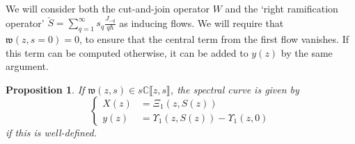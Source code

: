 \documentclass[10pt,a4paper,oneside,no-math,reqno]{amsart}%
\theoremstyle{plain}
\newtheorem{proposition}[theorem]{Proposition}
\theoremstyle{definition}
\theoremstyle{remark}
\numberwithin{equation}{section}
\newcommand{\mb}[1]{\mathbb{#1}}
\newcommand{\mf}[1]{\mathfrak{#1}}
\newcommand{\1}{\mathds{1}}
\newcommand{\C}{\mb{C}}
\newcommand{\<}{\langle}
\renewcommand{\>}{\rangle}
\begin{document}
We will consider both the cut-and-join operator $ W$ and the `right ramification operator' $ \check{S} = \sum_{q=1}^\infty s_q \frac{J_{-q}}{q\hbar} $ as inducing flows. We will require that $ \mf{w} (z, s= 0) = 0$, to ensure that the central term from the first flow vanishes. If this term can be computed otherwise, it can be added to $ y(z)$ by the same argument.

\begin{proposition}\label{GeneralSC}
	If $ \mf{w}(z,s) \in s\C \llbracket z, s\rrbracket $, the spectral curve is given by 
	\begin{equation}
		\begin{cases}
			X(z)
			&=
			\Xi_1 (z, S(z))
			\\
			y (z)
			&=
			\Upsilon_1 (z, S(z)) - \Upsilon_1 (z, 0)
		\end{cases} 
	\end{equation}
	if this is well-defined.
\end{proposition}
\end{document}
